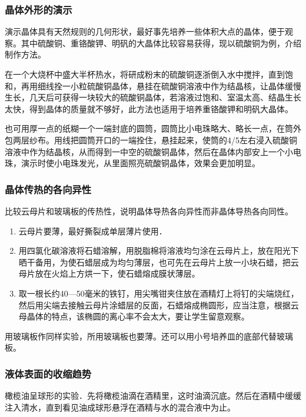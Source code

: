 \subsubsection{晶体外形的演示}

演示晶体具有天然规则的几何形状，最好事先培养一些体积大点的晶体，便于观察。其中硫酸铜、重铬酸钾、明矾的大晶体比较容易获得，现以硫酸铜为例，介绍制作方法。

在一个大烧杯中盛大半杯热水，将研成粉末的硫酸铜逐浙倒入水中搅拌，直到饱和，再用细线拴一小粒硫酸铜晶体，悬挂在硫酸铜溶液中作为结晶核，让晶体缓慢生长，几天后可获得一块较大的硫酸铜晶体，若溶液过饱和、室温太高、结晶生长太快，得到晶体的质量就不够好，此方法也适用于培养重铬酸钾和明矾大晶体。

也可用厚一点的纸糊一个一端封底的圆筒，圆筒比小电珠略大、略长一点，在筒外包两层纱布。用线把圆筒开口的一端拴住，悬挂起来，使筒的4/5左右浸入硫酸铜溶液中作为结晶核，从而得到一中空的硫酸铜晶体，然后在晶体内部安上一个小电珠，演示时使小电珠发光，从里面照亮硫酸铜晶体，效果会更加明显。

\subsubsection{晶体传热的各向异性}

比较云母片和玻璃板的传热性，说明晶体导热各向异性而非晶体导热各向同性。
\begin{enumerate}
    \item 云母片要薄，最好撕裂成单层薄片使用．
    \item 用四氯化碳溶液将石蜡溶解，用脱脂棉将溶液均匀涂在云母片上，放在阳光下晒干备用，为使石蜡层成为均匀薄层，也可先在云母片上放一小块石蜡，把云母片放在火焰上方烘一下，使石蜡熔成膜状薄层。
    \item 取一根长约40—50毫米的铁钉，用尖嘴钳夹住放在酒精灯上将钉的尖端烧红，然后用尖端去接触云母片涂蜡层的反面，石蜡熔成椭圆形，应当注意，根据云母晶体的特点，该椭圆的离心率不会太大，要让学生留意观察。
\end{enumerate}

用玻璃板作同样实验，所用玻璃板也要薄。还可以用小号培养皿的底部代替玻璃板。

\subsubsection{液体表面的收缩趋势}

橄榄油呈球形的实验．先将橄榄油滴在酒精里，这时油滴沉底。然后在酒精中缓缓注入清水，直到看见油成球形悬浮在酒精与水的混合液中为止。

